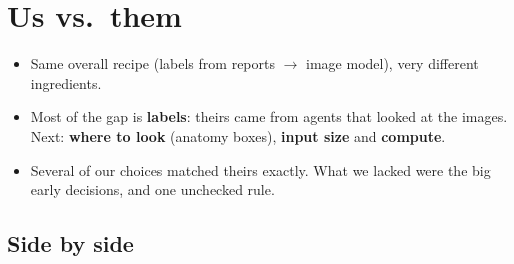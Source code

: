 \chapter{Us vs.\ them}
\label{ch:usvsthem}

\begin{tldr}
\begin{itemize}
\item Same overall recipe (labels from reports $\rightarrow$ image model), very different ingredients.
\item Most of the gap is \textbf{labels}: theirs came from agents that looked at the images. Next: \textbf{where to look}
      (anatomy boxes), \textbf{input size} and \textbf{compute}.
\item Several of our choices matched theirs exactly. What we lacked were the big early decisions, and one unchecked rule.
\end{itemize}
\end{tldr}

\section{Side by side}


